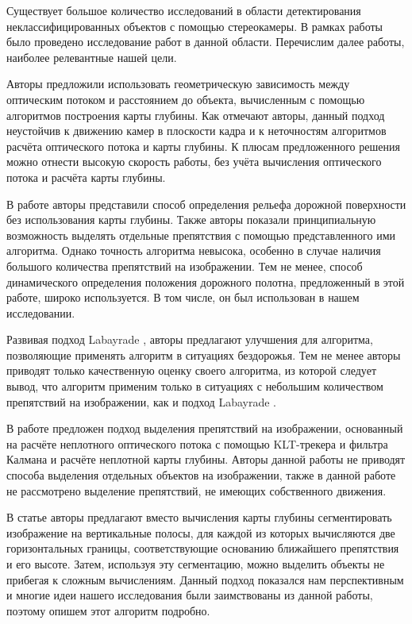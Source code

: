 \documentclass[aps,%
14pt,%
final,%
oneside,
onecolumn,%
musixtex, %
superscriptaddress,%
centertags]{extarticle} %
\begin{document}
Существует большое количество исследований в области детектирования неклассифицированных объектов с помощью стереокамеры. В рамках работы было проведено исследование работ в данной области. Перечислим далее работы, наиболее релевантные нашей цели.

Авторы \cite{heinrich2002fast} предложили использовать геометрическую зависимость между оптическим потоком и расстоянием до объекта, вычисленным с помощью алгоритмов построения карты глубины. Как отмечают авторы, данный подход неустойчив к движению камер в плоскости кадра и к неточностям алгоритмов расчёта оптического потока и карты глубины. К плюсам предложенного решения можно отнести высокую скорость работы, без учёта вычисления оптического потока и расчёта карты глубины.

В работе \cite{labayrade2002real} авторы представили способ определения рельефа дорожной поверхности без использования карты глубины. Также авторы показали принципиальную возможность выделять отдельные препятствия с помощью представленного ими алгоритма. Однако точность алгоритма невысока, особенно в случае наличия большого количества препятствий на изображении. Тем не менее, способ динамического определения положения дорожного полотна, предложенный в этой работе, широко используется. В том числе, он был использован в нашем исследовании.

Развивая подход Labayrade \cite{labayrade2002real}, авторы \cite{broggi2006single} предлагают улучшения для алгоритма, позволяющие применять алгоритм в ситуациях бездорожья. Тем не менее авторы приводят только качественную оценку своего алгоритма, из которой следует вывод, что алгоритм применим только в ситуациях с небольшим количеством препятствий на изображении, как и подход Labayrade  \cite{labayrade2002real}.

В работе \cite{franke20056d} предложен подход выделения препятствий на изображении, основанный на расчёте неплотного оптического потока с помощью KLT-трекера и фильтра Калмана и расчёте неплотной карты глубины. Авторы данной работы не приводят способа выделения отдельных объектов на изображении, также в данной работе не рассмотрено выделение препятствий, не имеющих собственного движения.

В статье \cite{pfeiffer2010efficient} авторы предлагают вместо вычисления карты глубины сегментировать изображение на вертикальные полосы, для каждой из которых вычисляются две горизонтальных границы, соответствующие основанию ближайшего препятствия и его высоте. Затем, используя эту сегментацию, можно выделить объекты не прибегая к сложным вычислениям. Данный подход показался нам перспективным и многие идеи нашего исследования были заимствованы из данной работы, поэтому опишем этот алгоритм подробно.
\end{document}
